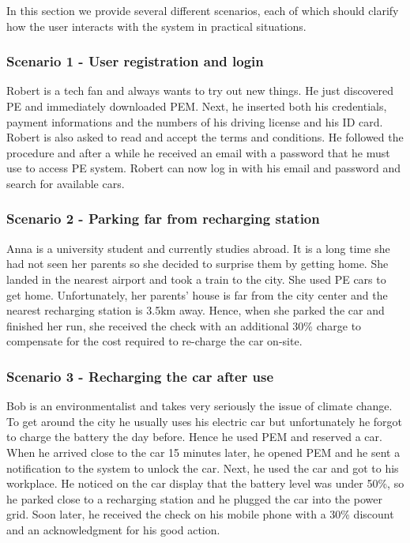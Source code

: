 In this section we provide several different scenarios, each of which should clarify how the user interacts with the system in practical situations.

\subsubsection{Scenario 1 - User registration and login}
Robert is a tech fan and always wants to try out new things. He just discovered PE and immediately downloaded PEM. Next, he inserted both his credentials, payment informations and the numbers of his driving license and his ID card. Robert is also asked to read and accept the terms and conditions. He followed the procedure and after a while he received an email with a password that he must use to access PE system. Robert can now log in with his email and password and search for available cars.

\subsubsection{Scenario 2 - Parking far from recharging station}
Anna is a university student and currently studies abroad. It is a long time she had not seen her parents so she decided to surprise them by getting home. She landed in the nearest airport and took a train to the city. She used PE cars to get home. Unfortunately, her parents' house is far from the city center and the nearest recharging station is 3.5km away. Hence, when she parked the car and finished her run, she received the check with an additional 30\% charge to compensate for the cost required to re-charge the car on-site. 

\subsubsection{Scenario 3 - Recharging the car after use}
Bob is an environmentalist and takes very seriously the issue of climate change. To get around the city he usually uses his electric car but unfortunately he forgot to charge the battery the day before. Hence he used PEM and reserved a car. When he arrived close to the car 15 minutes later, he opened PEM and he sent a notification to the system to unlock the car. Next, he used the car and got to his workplace. He noticed on the car display that the battery level was under 50\%, so he parked close to a recharging station and he plugged the car into the power grid. Soon later, he received the check on his mobile phone with a 30\% discount and an acknowledgment for his good action.

